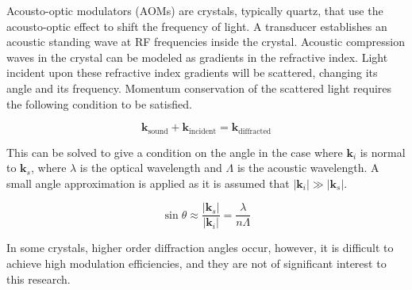 Acousto-optic modulators (AOMs) are crystals, typically quartz, that use the acousto-optic effect to shift the frequency of light. A transducer establishes an acoustic standing wave at RF frequencies inside the crystal. Acoustic compression waves in the crystal can be modeled as gradients in the refractive index. Light incident upon these refractive index gradients will be scattered, changing its angle and its frequency. Momentum conservation of the scattered light requires the following condition to be satisfied. \cite{haus}

\begin{equation}
\mathbf{k}_{\mathrm{sound}} + \mathbf{k}_{\mathrm{incident}} = \mathbf{k}_{\mathrm{diffracted}}
\end{equation}

This can be solved to give a condition on the angle in the case where $\mathbf{k}_i$ is normal to $\mathbf{k}_s$, where $\lambda$ is the optical wavelength and $\Lambda$ is the acoustic wavelength. A small angle approximation is applied as it is assumed that $|\mathbf{k}_i| \gg |\mathbf{k}_s|$.

\begin{equation} 
\sin{\theta} \approx \frac{|\mathbf{k}_s|}{|\mathbf{k}_i|} = \frac{\lambda}{n\Lambda}
\end{equation}

In some crystals, higher order diffraction angles occur, however, it is difficult to achieve high modulation efficiencies, and they are not of significant interest to this research.






